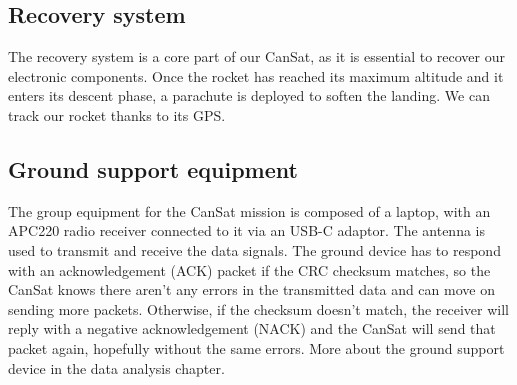 \subsection{Recovery system}

The recovery system is a core part of our CanSat, as it is essential to recover our electronic components. Once the rocket has reached its maximum altitude and it enters its descent phase, a parachute is deployed to soften the landing. We can track our rocket thanks to its GPS. 

\subsection{Ground support equipment}

The group equipment for the CanSat mission is composed of a laptop, with an APC220 radio receiver connected to it via an USB-C adaptor. The antenna is used to transmit and receive the data signals. The ground device has to respond with an acknowledgement (ACK) packet if the CRC checksum matches, so the CanSat knows there aren't any errors in the transmitted data and can move on sending more packets. Otherwise, if the checksum doesn't match, the receiver will reply with a negative acknowledgement (NACK) and the CanSat will send that packet again, hopefully without the same errors. More about the ground support device in the data analysis chapter.
